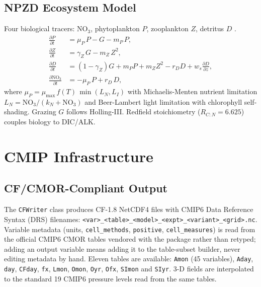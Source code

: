 \documentclass[11pt,a4paper]{article}
\newcommand{\pp}{\partial}
\begin{document}
\subsection{NPZD Ecosystem Model}

Four biological tracers: NO$_3$, phytoplankton $P$, zooplankton $Z$, detritus $D$ \citep{Fasham1990}.
\begin{align}
  \frac{\pp P}{\pp t} &= \mu_P\,P - G - m_P\,P, \\
  \frac{\pp Z}{\pp t} &= \gamma_Z\,G - m_Z\,Z^2, \\
  \frac{\pp D}{\pp t} &= (1-\gamma_Z)G + m_P P + m_Z Z^2 - r_D D + w_s\frac{\pp D}{\pp z}, \\
  \frac{\pp \mathrm{NO}_3}{\pp t} &= -\mu_P\,P + r_D\,D,
\end{align}
where $\mu_P = \mu_{\max}\,f(T)\,\min(L_N,L_I)$ with Michaelis-Menten nutrient limitation $L_N=\mathrm{NO}_3/(k_N+\mathrm{NO}_3)$ and Beer-Lambert light limitation with chlorophyll self-shading.  Grazing $G$ follows Holling-III.  Redfield stoichiometry ($R_{C:N}=6.625$) couples biology to DIC/ALK.

\section{CMIP Infrastructure}
\label{sec:cmip}

\subsection{CF/CMOR-Compliant Output}

The \texttt{CFWriter} class produces CF-1.8 NetCDF4 files with CMIP6 Data Reference Syntax (DRS) filenames: \texttt{<var>\_<table>\_<model>\_<expt>\_<variant>\_<grid>.nc}.  Variable metadata (units, \texttt{cell\_methods}, \texttt{positive}, \texttt{cell\_measures}) is read from the official CMIP6 CMOR tables vendored with the package rather than retyped; adding an output variable means adding it to the table-subset builder, never editing metadata by hand.  Eleven tables are available: \texttt{Amon} (45 variables), \texttt{Aday}, \texttt{day}, \texttt{CFday}, \texttt{fx}, \texttt{Lmon}, \texttt{Omon}, \texttt{Oyr}, \texttt{Ofx}, \texttt{SImon} and \texttt{SIyr}.  3-D fields are interpolated to the standard 19 CMIP6 pressure levels read from the same tables.
\end{document}
